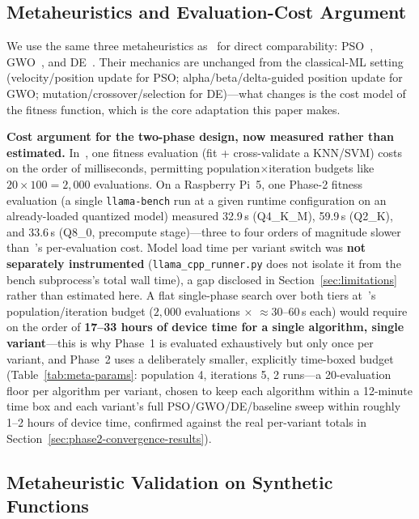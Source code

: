 \documentclass[journal]{IEEEtran}
\begin{document}
\subsection{Metaheuristics and Evaluation-Cost Argument}
\label{sec:cost-argument}

We use the same three metaheuristics as~\cite{ref11} for direct comparability: PSO~\cite{ref8}, GWO~\cite{ref9}, and DE~\cite{ref10}. Their mechanics are unchanged from the classical-ML setting (velocity/position update for PSO; alpha/beta/delta-guided position update for GWO; mutation/crossover/selection for DE)---what changes is the cost model of the fitness function, which is the core adaptation this paper makes.

\textbf{Cost argument for the two-phase design, now measured rather than estimated.} In~\cite{ref11}, one fitness evaluation (fit + cross-validate a KNN/SVM) costs on the order of milliseconds, permitting population$\times$iteration budgets like $20\times100=2{,}000$ evaluations. On a Raspberry Pi~5, one Phase-2 fitness evaluation (a single \texttt{llama-bench} run at a given runtime configuration on an already-loaded quantized model) measured 32.9\,s (Q4\_K\_M), 59.9\,s (Q2\_K), and 33.6\,s (Q8\_0, precompute stage)---three to four orders of magnitude slower than~\cite{ref11}'s per-evaluation cost. Model load time per variant switch was \textbf{not separately instrumented} (\texttt{llama\_cpp\_runner.py} does not isolate it from the bench subprocess's total wall time), a gap disclosed in Section~\ref{sec:limitations} rather than estimated here. A flat single-phase search over both tiers at~\cite{ref11}'s population/iteration budget ($2{,}000$ evaluations $\times$ $\approx$30--60\,s each) would require on the order of \textbf{17--33 hours of device time for a single algorithm, single variant}---this is why Phase~1 is evaluated exhaustively but only once per variant, and Phase~2 uses a deliberately smaller, explicitly time-boxed budget (Table~\ref{tab:meta-params}: population 4, iterations 5, 2 runs---a 20-evaluation floor per algorithm per variant, chosen to keep each algorithm within a 12-minute time box and each variant's full PSO/GWO/DE/baseline sweep within roughly 1--2 hours of device time, confirmed against the real per-variant totals in Section~\ref{sec:phase2-convergence-results}).

\subsection{Metaheuristic Validation on Synthetic Functions}
\label{sec:validation-method}
\end{document}
